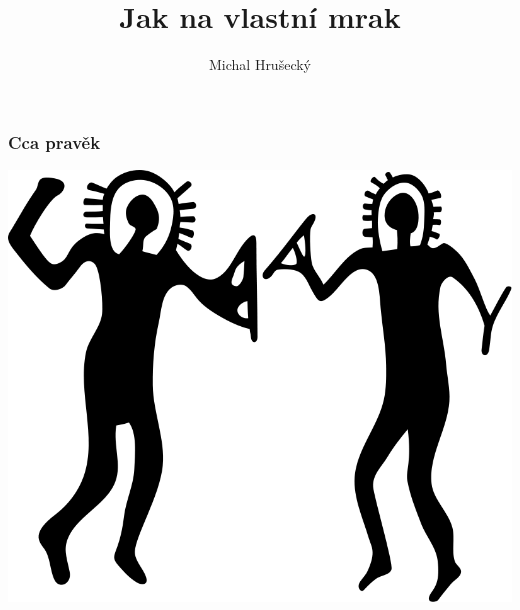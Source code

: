 \documentclass{beamer}
\author{Michal Hru\v{s}eck\'{y}\newline {\small openSUSE Boosters}}
\title{Jak na vlastní mrak}
\begin{document}
\begin{frame}[t,plain]
\titlepage
\end{frame}


\begin{frame}
\frametitle{Cca pravěk}
\begin{center}
\includegraphics[height=.7\paperheight]{SeriousTux-RockArt-AncientAstronauts}
\end{center}
\end{frame}
\end{document}
